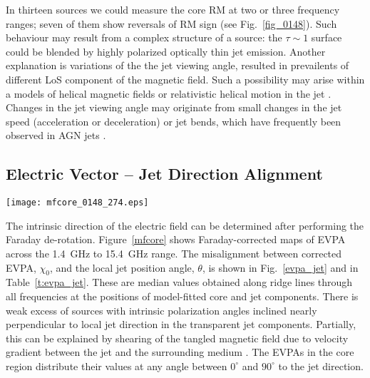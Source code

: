 \documentclass[a4paper,fleqn,usenatbib,useAMS]{mnras}
\begin{document}
In thirteen sources we could measure the core RM at two or three frequency ranges; seven of them show reversals of RM sign (see Fig.~\ref{fig_0148}).
Such behaviour may result from a complex structure of a source: the $\tau\sim1$ surface could be blended by highly polarized optically thin jet emission. 
Another explanation is variations of the the jet viewing angle, resulted in prevailents of different LoS component of the magnetic field. 
Such a possibility may arise within a models of helical magnetic fields \citep{osullivan_gabuzda_09} or relativistic helical motion in the jet \citep{broderick_loeb_09}. Changes in the jet viewing angle may originate from small changes in the jet speed (acceleration or deceleration) or jet bends, which have frequently been observed in AGN jets \citep[e.g.][]{2014AA...571L...2R,2016AJ....152...12L}.




\subsection{Electric Vector -- Jet Direction Alignment}
\label{s:evpa_theta}

\begin{figure*}
 \centering
 \texttt{[image: mfcore\_0148\_274.eps]}
 \caption{Faraday-corrected maps of electric vector position angle supplemented by linear polarization colour maps for 0148$+$274 in the 1.4~GHz to 15.4~GHz range. 
  Stokes $I$ contour plots together with E-field ticks for 1.4, 1.6, 2.2, 2.4, 4.6, 5.0, 8.1, 8.4, and 15.5~GHz are artificially shifted along R.A.\ or dec.\ axis in the negative direction such that optically thin jet components lay on the same horizontal or vertical line, respectively. 
  Black and white dots mark the positions of the modelled transparent jet and opaque core components.
  $I$ contours begin at the $5\sigma$ level and are plotted in $\times4$ steps.
  Results for other targets are presented in the electronic version of the article.
  \label{mfcore}
 }
\end{figure*}

The intrinsic direction of the electric field can be determined after performing the Faraday de-rotation.
Figure~\ref{mfcore} shows Faraday-corrected maps of EVPA across the 1.4~GHz to 15.4~GHz range.
The misalignment between corrected EVPA, $\chi_0$, and the local jet position angle, $\theta$, is shown in Fig.~\ref{evpa_jet} and in Table~\ref{t:evpa_jet}.
These are median values obtained along ridge lines through all frequencies at the positions of model-fitted core and jet components.
There is weak excess of sources with intrinsic polarization angles inclined nearly perpendicular to local jet direction in the transparent jet components. 
Partially, this can be explained by shearing of the tangled magnetic field due to velocity gradient between the jet and the surrounding medium \citep{1980MNRAS.193..439L,laing81}.
The EVPAs in the core region distribute their values at any angle between $0^\circ$ and $90^\circ$ to the jet direction.
\end{document}
